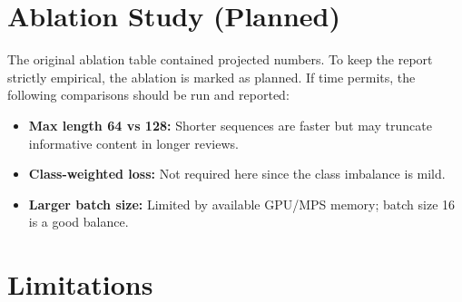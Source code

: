 \documentclass[11pt,a4paper]{article}
\begin{document}
\section{Ablation Study (Planned)}

The original ablation table contained projected numbers. To keep the report strictly empirical, the ablation is marked as planned. If time permits, the following comparisons should be run and reported:
\begin{itemize}[noitemsep]
    \item \textbf{Max length 64 vs 128:} Shorter sequences are faster but may truncate informative content in longer reviews.
    \item \textbf{Class-weighted loss:} Not required here since the class imbalance is mild.
    \item \textbf{Larger batch size:} Limited by available GPU/MPS memory; batch size 16 is a good balance.
\end{itemize}

\section{Limitations}
\end{document}
